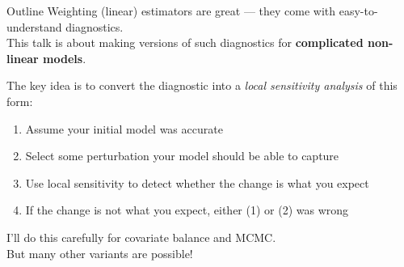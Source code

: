 \begin{frame}{Outline}
%
Weighting (linear) estimators are great --- they come with easy-to-understand diagnostics.\\[1em]

This talk is about making versions of such diagnostics for \textbf{complicated
non-linear models}.\\[2em]

\pause

The key idea is to convert the diagnostic into a \emph{local sensitivity analysis} of this form:

%
\begin{enumerate}
\item Assume your initial model was accurate
\item Select some perturbation your model should be able to capture
\item Use local sensitivity to detect whether the change is what you expect
\item If the change is not what you expect, either (1) or (2) was wrong
\end{enumerate}
%
\pause
\vspace{2em}
I'll do this carefully for covariate balance and MCMC.\\[1em]
But many other variants are possible!
\end{frame}



